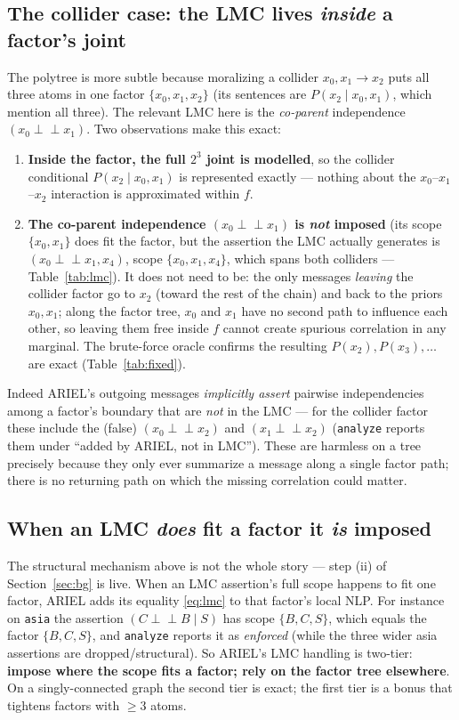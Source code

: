 \documentclass[11pt]{article}
\newcommand{\indep}{\perp\!\!\!\perp}
\begin{document}
\subsection{The collider case: the LMC lives \emph{inside} a factor's joint}
The polytree is more subtle because moralizing a collider $x_0,x_1\!\to\!x_2$ puts all three atoms
in one factor $\{x_0,x_1,x_2\}$ (its sentences are $P(x_2\mid x_0,x_1)$, which mention all three).
The relevant LMC here is the \emph{co-parent} independence $(x_0\indep x_1)$. Two observations make
this exact:
\begin{enumerate}
  \item \textbf{Inside the factor, the full $2^3$ joint is modelled}, so the collider conditional
    $P(x_2\mid x_0,x_1)$ is represented exactly --- nothing about the $x_0$--$x_1$--$x_2$
    interaction is approximated within $f$.
  \item \textbf{The co-parent independence $(x_0\indep x_1)$ is \emph{not} imposed} (its scope
    $\{x_0,x_1\}$ does fit the factor, but the assertion the LMC actually generates is
    $(x_0\indep x_1,x_4)$, scope $\{x_0,x_1,x_4\}$, which spans both colliders --- Table~\ref{tab:lmc}).
    It does not need to be: the only messages \emph{leaving} the collider factor go to $x_2$
    (toward the rest of the chain) and back to the priors $x_0,x_1$; along the factor tree, $x_0$
    and $x_1$ have no second path to influence each other, so leaving them free inside $f$ cannot
    create spurious correlation in any marginal. The brute-force oracle confirms the resulting
    $P(x_2),P(x_3),\dots$ are exact (Table~\ref{tab:fixed}).
\end{enumerate}
Indeed ARIEL's outgoing messages \emph{implicitly assert} pairwise independencies among a factor's
boundary that are \emph{not} in the LMC --- for the collider factor these include the (false)
$(x_0\indep x_2)$ and $(x_1\indep x_2)$ (\texttt{analyze} reports them under ``added by ARIEL, not
in LMC''). These are harmless on a tree precisely because they only ever summarize a message along
a single factor path; there is no returning path on which the missing correlation could matter.

\subsection{When an LMC \emph{does} fit a factor it \emph{is} imposed}
The structural mechanism above is not the whole story --- step (ii) of Section~\ref{sec:bg} is live.
When an LMC assertion's full scope happens to fit one factor, ARIEL adds its equality
\eqref{eq:lmc} to that factor's local NLP. For instance on \texttt{asia} the assertion
$(C\indep B\mid S)$ has scope $\{B,C,S\}$, which equals the factor $\{B,C,S\}$, and \texttt{analyze}
reports it as \emph{enforced} (while the three wider asia assertions are dropped/structural).
So ARIEL's LMC handling is two-tier: \textbf{impose where the scope fits a factor; rely on the
factor tree elsewhere}. On a singly-connected graph the second tier is exact; the first tier is a
bonus that tightens factors with $\ge3$ atoms.
\end{document}
